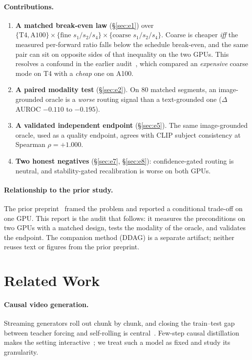 \documentclass[journal]{IEEEtran}
\begin{document}
\paragraph{Contributions.}
\begin{enumerate}
  \item \textbf{A matched break-even law} (\S\ref{sec:e1}) over
  $\{\text{T4},\text{A100}\}\times\{\text{fine }s_1/s_2/s_4\}\times\{\text{coarse }s_1/s_2/s_4\}$.
  Coarse is cheaper \emph{iff} the measured per-forward ratio falls below the schedule break-even, and
  the same pair can sit on opposite sides of that inequality on the two GPUs. This resolves a confound
  in the earlier audit~\cite{jisan2026audit}, which compared an \emph{expensive} coarse mode on T4 with a
  \emph{cheap} one on A100.
  \item \textbf{A paired modality test} (\S\ref{sec:e2}). On 80 matched segments, an image-grounded
  oracle is a \emph{worse} routing signal than a text-grounded one ($\Delta$AUROC $-0.110$ to $-0.195$).
  \item \textbf{A validated independent endpoint} (\S\ref{sec:e5}). The same image-grounded oracle, used
  as a quality endpoint, agrees with CLIP subject consistency at Spearman $\rho{=}{+}1.000$.
  \item \textbf{Two honest negatives} (\S\ref{sec:e7}, \S\ref{sec:e8}): confidence-gated routing is
  neutral, and stability-gated recalibration is worse on both GPUs.
\end{enumerate}

\paragraph{Relationship to the prior study.}
The prior preprint~\cite{jisan2026audit} framed the problem and reported a conditional trade-off on one
GPU. This report is the audit that follows: it measures the preconditions on two GPUs with a matched
design, tests the modality of the oracle, and validates the endpoint. The companion method (DDAG) is a
separate artifact; neither reuses text or figures from the prior preprint.

\section{Related Work}
\paragraph{Causal video generation.}
Streaming generators roll out chunk by chunk, and closing the train--test gap between teacher forcing and
self-rolling is central~\cite{huang2025self,zhu2026causal}. Few-step causal distillation makes the setting
interactive~\cite{zheng2026causalrcm}; we treat such a model as fixed and study its granularity.
\end{document}
